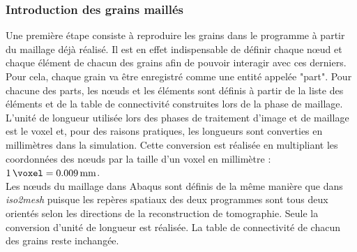 		\subsubsection{Introduction des grains maillés}
			Une première étape consiste à reproduire les grains dans le programme à partir du maillage déjà réalisé. Il est en effet indispensable de définir chaque n\oe{}ud et chaque élément de chacun des grains afin de pouvoir interagir avec ces derniers. Pour cela, chaque grain va être enregistré comme une entité appelée "part". Pour chacune des parts, les n\oe{}uds et les éléments sont définis à partir de la liste des éléments et de la table de connectivité construites lors de la phase de maillage. L'unité de longueur utilisée lors des phases de traitement d'image et de maillage est le voxel et, pour des raisons pratiques, les longueurs sont converties en millimètres dans la simulation. Cette conversion est réalisée en multipliant les coordonnées des n\oe{}uds par la taille d'un voxel en millimètre : $\SI{1}{\voxel} = \SI{0.009}{\milli\meter}$.
			\\Les n\oe{}uds du maillage dans Abaqus sont définis de la même manière que dans \textit{iso2mesh} puisque les repères spatiaux des deux programmes sont tous deux orientés selon les directions de la reconstruction de tomographie. Seule la conversion d'unité de longueur est réalisée. La table de connectivité de chacun des grains reste inchangée.
